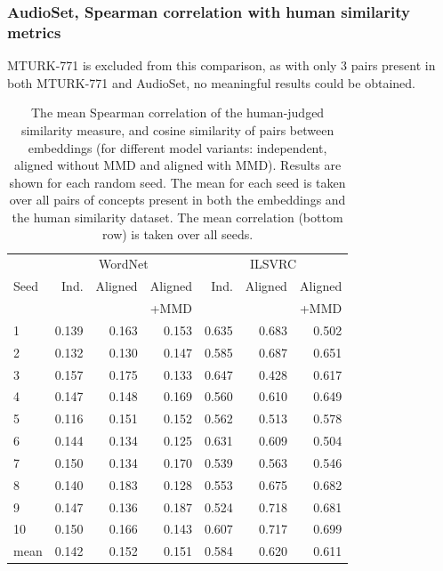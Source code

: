 \subsubsection{AudioSet, Spearman correlation with human similarity metrics}

MTURK-771 is excluded from this comparison, as with only 3 pairs present in both MTURK-771 and AudioSet, no meaningful results could be obtained. 

\begin{table}[H]
\centering
\begin{tabular}{lrrrrrr}
  \toprule
\multicolumn{1}{r}{} & \multicolumn{3}{c}{WordNet} & \multicolumn{3}{c}{ILSVRC} \\
\cmidrule(lr){2-4} \cmidrule(lr){5-7} 
{Seed} &  Ind. &   Aligned &  Aligned  & Ind. &   Aligned &  Aligned   \\
{}     &       &           & +MMD      &      &           &   +MMD     \\
\midrule
1    &    0.139 &  0.163 &   0.153 &   0.635 &  0.683 &   0.502    \\
2    &    0.132 &  0.130 &   0.147 &   0.585 &  0.687 &   0.651   \\
3    &    0.157 &  0.175 &   0.133 &   0.647 &  0.428 &   0.617   \\
4    &    0.147 &  0.148 &   0.169 &   0.560 &  0.610 &   0.649   \\
5    &    0.116 &  0.151 &   0.152 &   0.562 &  0.513 &   0.578   \\
6    &    0.144 &  0.134 &   0.125 &   0.631 &  0.609 &   0.504   \\
7    &    0.150 &  0.134 &   0.170 &   0.539 &  0.563 &   0.546   \\
8    &    0.140 &  0.183 &   0.128 &   0.553 &  0.675 &   0.682   \\
9    &    0.147 &  0.136 &   0.187 &   0.524 &  0.718 &   0.681   \\
10   &    0.150 &  0.166 &   0.143 &   0.607 &  0.717 &   0.699   \\
\midrule                                                                   
mean &    0.142 &  0.152 &   0.151 &   0.584 &  0.620 &   0.611   \\
\bottomrule
\end{tabular}
\caption{The mean Spearman correlation of the human-judged similarity measure, and cosine similarity of pairs between embeddings (for different model variants: independent, aligned without MMD and aligned with MMD). Results are shown for each random seed. The mean for each seed is taken over all pairs of concepts present in both the embeddings and the human similarity dataset. The mean correlation (bottom row) is taken over all seeds. }
\end{table}

